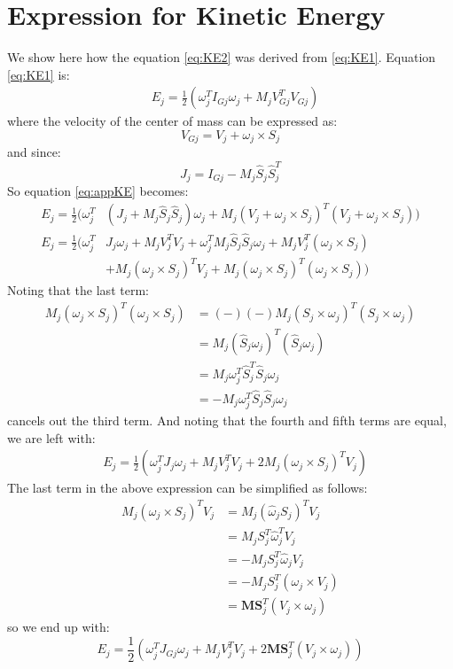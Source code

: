 \documentclass[a4paper,10pt]{article}
\begin{document}
\section{Expression for Kinetic Energy} \label{sec:expressionKE}
We show here how the equation \ref{eq:KE2} was derived from \ref{eq:KE1}. Equation \ref{eq:KE1} is:
\begin{align}
 &E_j = \frac{1}{2}(\omega_j^TI_{Gj}\omega_j+M_jV_{Gj}^TV_{Gj}) \label{eq:appKE}
\end{align} where the velocity of the center of mass can be expressed as:
\[
 V_{Gj} = V_j + \omega_j \times S_j
\] and since:
\[
 J_j = I_{Gj} - M_j \hat{S}_j \hat{S}_j^T
\] So equation \ref{eq:appKE} becomes:
\begin{align*}
 E_j = \frac{1}{2}(\omega_j^T&(J_j + M_j \hat{S}_j \hat{S}_j)\omega_j+M_j(V_j + \omega_j \times S_j)^T(V_j + \omega_j \times S_j)) \\
 E_j = \frac{1}{2}(\omega_j^T&J_j\omega_j+M_jV_j^TV_j+ \omega_j^TM_j\hat{S}_j\hat{S}_j\omega_j+M_jV_j^T(\omega_j\times S_j) \nonumber \\
 &+ M_j(\omega_j \times S_j)^TV_j+M_j(\omega_j \times S_j)^T(\omega_j \times S_j)) 
\end{align*} Noting that the last term:
\begin{align*}
 M_j(\omega_j \times S_j)^T(\omega_j \times S_j) &= (-)(-)M_j(S_j \times \omega_j)^T(S_j \times \omega_j) \\ &= M_j(\hat{S}_j\omega_j)^T(\hat{S}_j\omega_j) \\ &= M_j\omega_j^T\hat{S}_j^T\hat{S}_j\omega_j \\ &= -M_j\omega_j^T\hat{S}_j\hat{S}_j\omega_j
\end{align*} cancels out the third term. And noting that the fourth and fifth terms are equal, we are left with:
\begin{align*}
 &E_j = \frac{1}{2}(\omega_j^TJ_j\omega_j+M_jV_j^TV_j+ 2M_j(\omega_j\times S_j)^TV_j) 
\end{align*} The last term in the above expression can be simplified as follows:
\begin{align*}
 M_j(\omega_j\times S_j)^TV_j &= M_j(\hat{\omega}_jS_j)^TV_j \\ &= M_jS_j^T\hat{\omega}_j^TV_j \\ &= -M_jS_j^T\hat{\omega}_jV_j \\ &= -M_jS_j^T(\omega_j \times V_j) \\ &= \mathbf{MS}_j^T(V_j \times \omega_j)
\end{align*} so we end up with:
\[
 E_j = \frac{1}{2}(\omega_j^TJ_{Gj}\omega_j+M_jV_j^TV_j + 2\mathbf{MS}_j^T(V_j \times \omega_j))
\]
\end{document}
